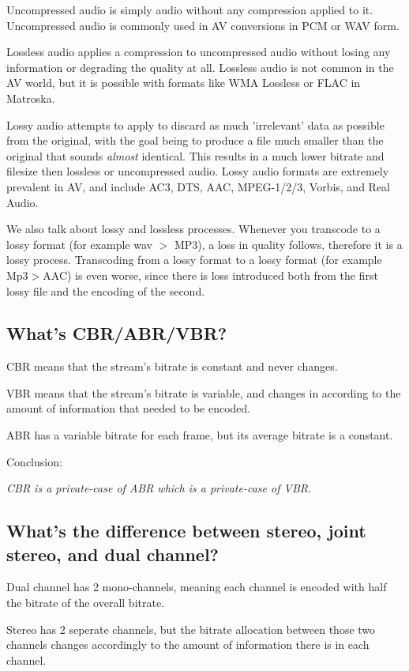 ﻿\documentclass[12pt]{article}
\begin{document}
Uncompressed audio is simply audio without any compression applied to it. Uncompressed audio is
commonly used in AV conversions in PCM or WAV form.

Lossless audio applies a compression to uncompressed audio without losing any information or
degrading the quality at all. Lossless audio is not common in the AV world, but it is possible with
formats like WMA Lossless or FLAC in Matroska.

Lossy audio attempts to apply to discard as much 'irrelevant' data as possible from the original,
with the goal being to produce a file much smaller than the original that sounds \emph{almost}
identical. This results in a much lower bitrate and filesize then lossless or uncompressed audio.
Lossy audio formats are extremely prevalent in AV, and include AC3, DTS, AAC, MPEG-1/2/3, Vorbis,
and Real Audio.

We also talk about lossy and lossless processes. Whenever you transcode to a lossy format (for
example wav $>$ MP3), a loss in quality follows, therefore it is a lossy process. Transcoding from a
lossy format to a lossy format (for example Mp3$>$AAC) is even worse, since there is loss introduced
both from the first lossy file and the encoding of the second.

\subsection{What's CBR/ABR/VBR?}

CBR means that the stream's bitrate is constant and never changes.

VBR means that the stream's bitrate is variable, and changes in according to the amount of
information that needed to be encoded.

ABR has a variable bitrate for each frame, but its average bitrate is a constant.

Conclusion:

\emph{CBR is a private-case of ABR which is a private-case of VBR.}

\subsection{What's the difference between stereo, joint stereo, and dual channel?}

Dual channel has 2 mono-channels, meaning each channel is encoded with half the bitrate of the
overall bitrate.

Stereo has 2 seperate channels, but the bitrate allocation between those two channels changes
accordingly to the amount of information there is in each channel.
\end{document}
